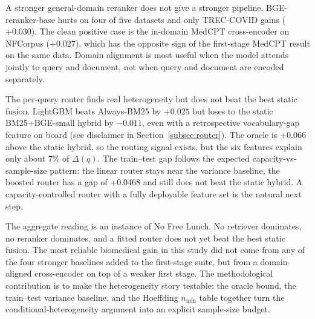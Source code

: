 \documentclass[11pt,a4paper]{article}
\begin{document}
A stronger general-domain reranker does not give a stronger pipeline.
BGE-reranker-base hurts on four of five datasets and only TREC-COVID
gains ($+0.030$). The clean positive case is the in-domain MedCPT
cross-encoder on NFCorpus ($+0.027$), which has the opposite sign of
the first-stage MedCPT result on the same data. Domain alignment is
most useful when the model attends jointly to query and document, not
when query and document are encoded separately.

The per-query router finds real heterogeneity but does not beat the
best static fusion. LightGBM beats Always-BM25 by $+0.025$ but loses
to the static BM25+BGE-small hybrid by $-0.011$, even with a
retrospective vocabulary-gap feature on board (see disclaimer in
Section~\ref{subsec:router}). The oracle is $+0.066$ above the static
hybrid, so the routing signal exists, but the six features explain
only about 7\% of $\Delta(q)$. The train--test gap follows the
expected capacity-vs-sample-size pattern: the linear router stays
near the variance baseline, the boosted router has a gap of $+0.0468$
and still does not beat the static hybrid. A capacity-controlled
router with a fully deployable feature set is the natural next
step.

The aggregate reading is an instance of No Free Lunch. No retriever
dominates, no reranker dominates, and a fitted router does not yet
beat the best static fusion. The most reliable biomedical gain in
this study did not come from any of the four stronger baselines added
to the first-stage suite, but from a domain-aligned cross-encoder on
top of a weaker first stage. The methodological contribution is to
make the heterogeneity story testable: the oracle bound, the
train--test variance baseline, and the Hoeffding $n_{\min}$ table
together turn the conditional-heterogeneity argument into an explicit
sample-size budget.

\printbibliography
\end{document}
